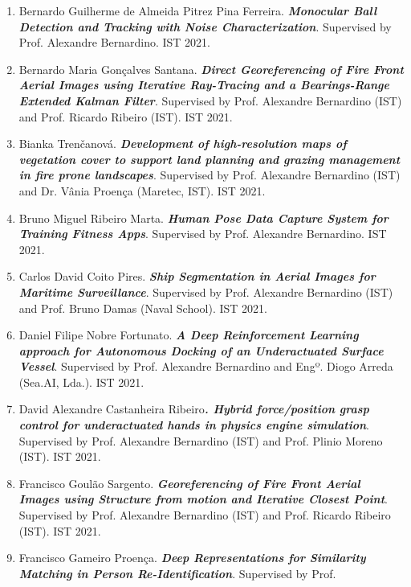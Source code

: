 \begin{enumerate}
{{  simulation, analytic linearization and optimal control of a 6
  tendon-driven biomimetic eye: a tool for studying human oculomotor
  control}}. Supervised by Alexandre Bernardino (IST) and Prof. John van
  Opstal (Radboud Univ, Nijmegen, Netherlands). IST 2021.
\item
  Bernardo Guilherme de Almeida Pitrez Pina Ferreira.
  \emph{\textbf{Monocular Ball Detection and Tracking with Noise
  Characterization}}. Supervised by Prof. Alexandre Bernardino. IST
  2021.
\item
  Bernardo Maria Gonçalves Santana. \emph{\textbf{Direct Georeferencing
  of Fire Front Aerial Images using Iterative Ray-Tracing and a
  Bearings-Range Extended Kalman Filter}}. Supervised by Prof. Alexandre
  Bernardino (IST) and Prof. Ricardo Ribeiro (IST). IST 2021.
\item
  Bianka Trenčanová. \emph{\textbf{Development of high-resolution maps
  of vegetation cover to support land planning and grazing management in
  fire prone landscapes}}. Supervised by Prof. Alexandre Bernardino
  (IST) and Dr. Vânia Proença (Maretec, IST). IST 2021.
\item
  Bruno Miguel Ribeiro Marta. \emph{\textbf{Human Pose Data Capture
  System for Training Fitness Apps}}. Supervised by Prof. Alexandre
  Bernardino. IST 2021.
\item
  Carlos David Coito Pires. \emph{\textbf{Ship Segmentation in Aerial
  Images for Maritime Surveillance}}. Supervised by Prof. Alexandre
  Bernardino (IST) and Prof. Bruno Damas (Naval School). IST 2021.
\item
  Daniel Filipe Nobre Fortunato. \emph{\textbf{A Deep Reinforcement
  Learning approach for Autonomous Docking of an Underactuated Surface
  Vessel}}. Supervised by Prof. Alexandre Bernardino and Engº. Diogo
  Arreda (Sea.AI, Lda.). IST 2021.
\item
  David Alexandre Castanheira Ribeiro\emph{\textbf{. Hybrid
  force/position grasp control for underactuated hands in physics engine
  simulation}}. Supervised by Prof. Alexandre Bernardino (IST) and Prof.
  Plinio Moreno (IST). IST 2021.
\item
  Francisco Goulão Sargento. \emph{\textbf{Georeferencing of Fire Front
  Aerial Images using Structure from motion and Iterative Closest
  Point}}. Supervised by Prof. Alexandre Bernardino (IST) and Prof.
  Ricardo Ribeiro (IST). IST 2021.
\item
  Francisco Gameiro Proença. \emph{\textbf{Deep Representations for
  Similarity Matching in Person Re-Identification}}. Supervised by Prof.

\end{enumerate}
